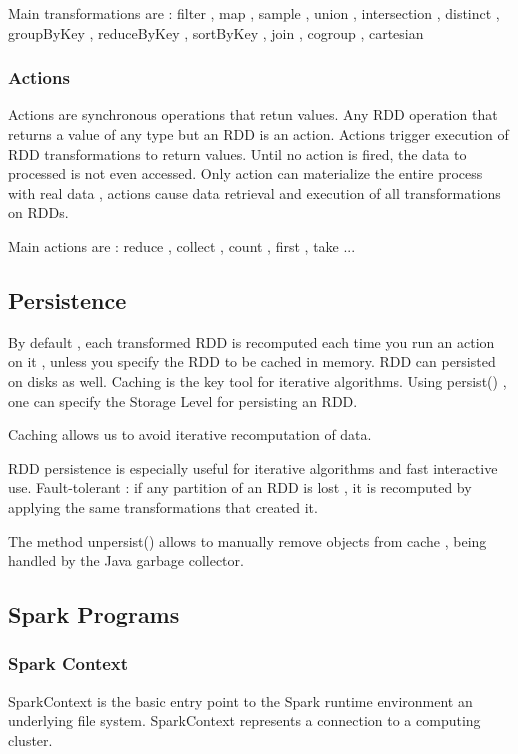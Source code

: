 \documentclass{article}
\begin{document}
Main transformations are : filter , map , sample , union , intersection , distinct , groupByKey , reduceByKey , sortByKey , join , cogroup , cartesian

\subsubsection{Actions}

Actions are synchronous operations that retun values.
Any RDD operation that returns a value of any type but an RDD is an action.
Actions trigger execution of RDD transformations to return values.
Until no action is fired, the data to processed is not even accessed.
Only action can materialize the entire process with real data , actions cause data retrieval and execution of all transformations on RDDs.

Main actions are : reduce , collect , count , first , take ...

\subsection{Persistence}

By default , each transformed RDD is recomputed each time you run an action on it , unless you specify the RDD to be cached in memory.
RDD can persisted on disks as well.
Caching is the key tool for iterative algorithms.
Using persist() , one can specify the Storage Level for persisting an RDD.


Caching allows us to avoid iterative recomputation of data.

RDD persistence is especially useful for iterative algorithms and fast interactive use.
Fault-tolerant : if any partition of an RDD is lost , it is recomputed by applying the same transformations that created it.

The method unpersist() allows to manually remove objects from cache , being handled by the Java garbage collector.


\subsection{Spark Programs}

\subsubsection{Spark Context}
SparkContext is the basic entry point to the Spark runtime environment an underlying file system.
SparkContext represents a connection to a computing cluster.
\end{document}
